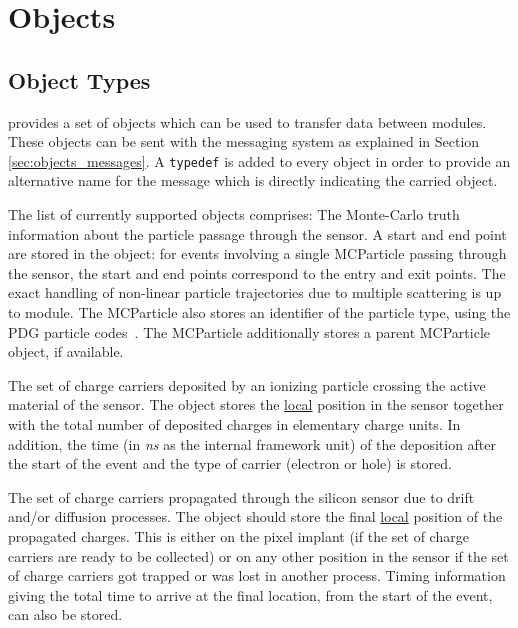 \section{Objects}
\label{sec:objects}

\subsection{Object Types}
\label{sec:objtypes}

\apsq provides a set of objects which can be used to transfer data between modules.
These objects can be sent with the messaging system as explained in Section \ref{sec:objects_messages}.
A \texttt{typedef} is added to every object in order to provide an alternative name for the message which is directly indicating the carried object.

The list of currently supported objects comprises:
The Monte-Carlo truth information about the particle passage through the sensor.
A start and end point are stored in the object: for events involving a single MCParticle passing through the sensor, the start and end points correspond to the entry and exit points.
The exact handling of non-linear particle trajectories due to multiple scattering is up to module.
The MCParticle also stores an identifier of the particle type, using the PDG particle codes~\cite{pdg}.
The MCParticle additionally stores a parent MCParticle object, if available.

The set of charge carriers deposited by an ionizing particle crossing the active material of the sensor.
The object stores the \underline{local} position in the sensor together with the total number of deposited charges in elementary charge units.
In addition, the time (in \textit{ns} as the internal framework unit) of the deposition after the start of the event and the type of carrier (electron or hole) is stored.

The set of charge carriers propagated through the silicon sensor due to drift and/or diffusion processes.
The object should store the final \underline{local} position of the propagated charges.
This is either on the pixel implant (if the set of charge carriers are ready to be collected) or on any other position in the sensor if the set of charge carriers got trapped or was lost in another process.
Timing information giving the total time to arrive at the final location, from the start of the event, can also be stored.

